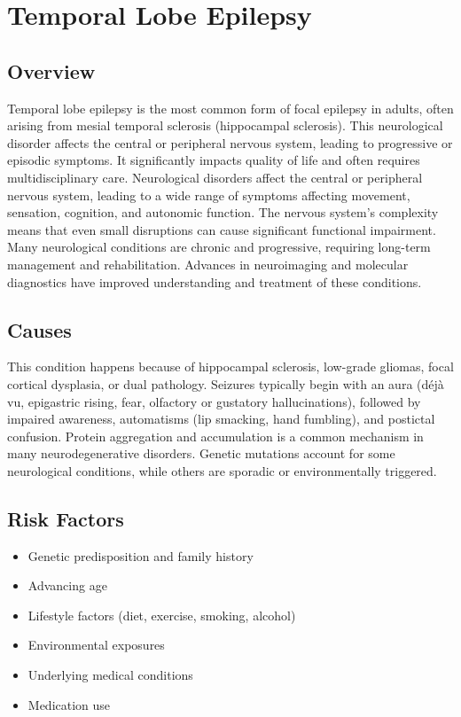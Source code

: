 \chapter{Temporal Lobe Epilepsy}
\label{sec:Temporal Lobe Epilepsy}

\section{Overview}
Temporal lobe epilepsy is the most common form of focal epilepsy in adults, often arising from mesial temporal sclerosis (hippocampal sclerosis). This neurological disorder affects the central or peripheral nervous system, leading to progressive or episodic symptoms. It significantly impacts quality of life and often requires multidisciplinary care. Neurological disorders affect the central or peripheral nervous system, leading to a wide range of symptoms affecting movement, sensation, cognition, and autonomic function. The nervous system's complexity means that even small disruptions can cause significant functional impairment. Many neurological conditions are chronic and progressive, requiring long-term management and rehabilitation. Advances in neuroimaging and molecular diagnostics have improved understanding and treatment of these conditions.
\section{Causes}
This condition happens because of hippocampal sclerosis, low-grade gliomas, focal cortical dysplasia, or dual pathology. Seizures typically begin with an aura (d\'{e}j\`{a} vu, epigastric rising, fear, olfactory or gustatory hallucinations), followed by impaired awareness, automatisms (lip smacking, hand fumbling), and postictal confusion.    Protein aggregation and accumulation is a common mechanism in many neurodegenerative disorders.  Genetic mutations account for some neurological conditions, while others are sporadic or environmentally triggered.   
\section{Risk Factors}
\begin{itemize}[noitemsep]
  \item Genetic predisposition and family history
  \item Advancing age
  \item Lifestyle factors (diet, exercise, smoking, alcohol)
  \item Environmental exposures
  \item Underlying medical conditions
  \item Medication use
\end{itemize}
